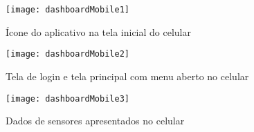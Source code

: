 \begin{figure}[H]
	\centering
	\caption{Ícone do aplicativo na tela inicial do celular}
	\texttt{[image: dashboardMobile1]}
	\label{fig:dashboardMobile1}
\end{figure}

\begin{figure}[H]
	\centering
	\caption{Tela de login e tela principal com menu aberto no celular}
	\texttt{[image: dashboardMobile2]}
	\label{fig:dashboardMobile2}
\end{figure}

\begin{figure}[H]
	\centering
	\caption{Dados de sensores apresentados no celular}
	\texttt{[image: dashboardMobile3]}
	\label{fig:dashboardMobile3}
\end{figure}
